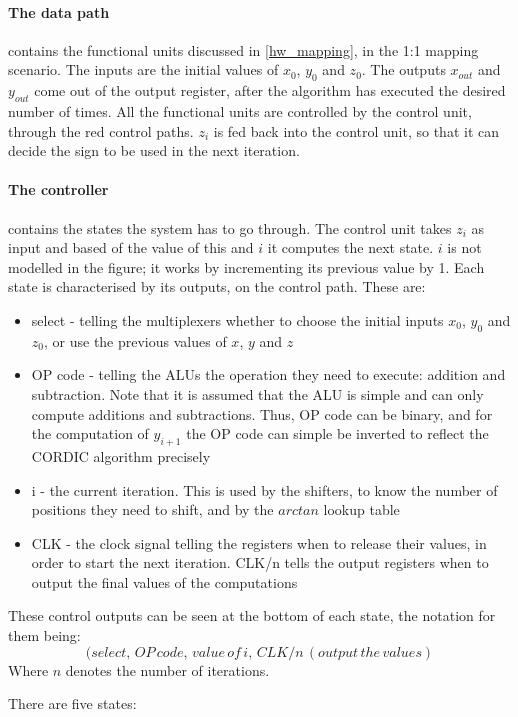 \documentclass[12pt, a4paper,oneside]{article}
\begin{document}
\paragraph{The data path}
contains the functional units discussed in \ref{hw_mapping}, in the 1:1 mapping
scenario. The inputs are the initial values of $x_0$, $y_0$ and $z_0$. The outputs
$x_{out}$ and $y_{out}$
come out of the output register, after the algorithm has executed the desired
number of times. All the functional units are controlled by the control unit, 
through the red control paths. $z_i$ is fed back into the control unit, 
so that it can decide the sign to be used in the next iteration.

\paragraph{The controller}
contains the states the system has to go through. The control unit takes
$z_i$ as input and based of the value of this and $i$ it computes the next state.
$i$ is not modelled in the figure; it works by incrementing its previous
value by 1. Each state is characterised by its outputs, on the control
path. These are:

\begin{itemize}
	\item select - telling the multiplexers whether to choose the initial 
	inputs  $x_0$, $y_0$ and $z_0$, or use the previous values of 
	$x$, $y$ and $z$
	\item OP code - telling the ALUs the operation they need to execute:
	addition and subtraction. Note that it is assumed that the ALU is simple and can only
	compute additions and subtractions. Thus, OP code can be binary, and for the computation
	of $y_{i+1}$ the OP code can simple be inverted to reflect the CORDIC algorithm precisely
	\item i - the current iteration. This is used by the shifters, to 
	know the number of positions they need to shift, and by the $arctan$
	lookup table
	\item CLK - the clock signal telling the registers when to release their
	values, in order to start the next iteration. CLK/n tells the output registers
	when to output the final values of the computations
\end{itemize}

These control outputs can be seen at the bottom of each state, the notation for them being:
\[(select,\, OP\, code,\, value\, of\, i,\, CLK/n\,(output\, the\, values)\]
Where $n$ denotes the number of iterations.

There are five states:

\newpage
\printbibliography
\end{document}

